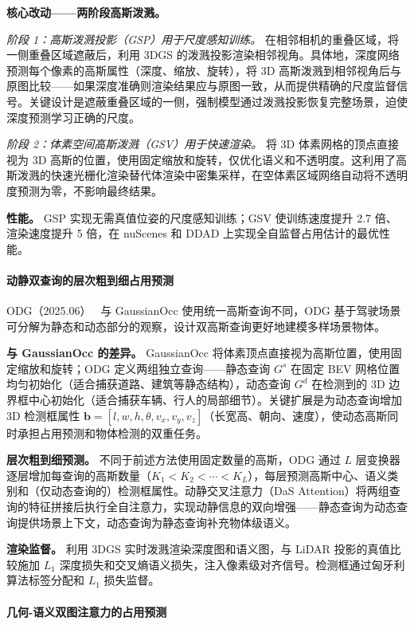 \textbf{核心改动——两阶段高斯泼溅。}

\textit{阶段 1：高斯泼溅投影（GSP）用于尺度感知训练。} 在相邻相机的重叠区域，将一侧重叠区域遮蔽后，利用 3DGS 的泼溅投影渲染相邻视角。具体地，深度网络预测每个像素的高斯属性（深度、缩放、旋转），将 3D 高斯泼溅到相邻视角后与原图比较——如果深度准确则渲染结果应与原图一致，从而提供精确的尺度监督信号。关键设计是遮蔽重叠区域的一侧，强制模型通过泼溅投影恢复完整场景，迫使深度预测学习正确的尺度。

\textit{阶段 2：体素空间高斯泼溅（GSV）用于快速渲染。} 将 3D 体素网格的顶点直接视为 3D 高斯的位置，使用固定缩放和旋转，仅优化语义和不透明度。这利用了高斯泼溅的快速光栅化渲染替代体渲染中密集采样，在空体素区域网络自动将不透明度预测为零，不影响最终结果。

\textbf{性能。} GSP 实现无需真值位姿的尺度感知训练；GSV 使训练速度提升 2.7 倍、渲染速度提升 5 倍，在 nuScenes 和 DDAD 上实现全自监督占用估计的最优性能。

\paragraph{动静双查询的层次粗到细占用预测}

ODG（2025.06）~\cite{2506_09417} 与 GaussianOcc 使用统一高斯查询不同，ODG 基于驾驶场景可分解为静态和动态部分的观察，设计双高斯查询更好地建模多样场景物体。

\textbf{与 GaussianOcc 的差异。} GaussianOcc 将体素顶点直接视为高斯位置，使用固定缩放和旋转；ODG 定义两组独立查询——静态查询 $G^s$ 在固定 BEV 网格位置均匀初始化（适合捕获道路、建筑等静态结构），动态查询 $G^d$ 在检测到的 3D 边界框中心初始化（适合捕获车辆、行人的局部细节）。关键扩展是为动态查询增加 3D 检测框属性 $\mathbf{b} = [l, w, h, \theta, v_x, v_y, v_z]$（长宽高、朝向、速度），使动态高斯同时承担占用预测和物体检测的双重任务。

\textbf{层次粗到细预测。} 不同于前述方法使用固定数量的高斯，ODG 通过 $L$ 层变换器逐层增加每查询的高斯数量（$K_1 < K_2 < \cdots < K_L$），每层预测高斯中心、语义类别和（仅动态查询的）检测框属性。动静交叉注意力（DaS Attention）将两组查询的特征拼接后执行全自注意力，实现动静信息的双向增强——静态查询为动态查询提供场景上下文，动态查询为静态查询补充物体级语义。

\textbf{渲染监督。} 利用 3DGS 实时泼溅渲染深度图和语义图，与 LiDAR 投影的真值比较施加 $L_1$ 深度损失和交叉熵语义损失，注入像素级对齐信号。检测框通过匈牙利算法标签分配和 $L_1$ 损失监督。

\paragraph{几何-语义双图注意力的占用预测}

